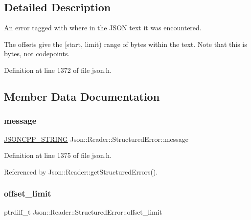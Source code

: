 \subsection{Detailed Description}
An error tagged with where in the J\+S\+ON text it was encountered. 

The offsets give the \mbox{[}start, limit) range of bytes within the text. Note that this is bytes, not codepoints. 

Definition at line 1372 of file json.\+h.



\subsection{Member Data Documentation}
\mbox{\label{struct_json_1_1_reader_1_1_structured_error_a2d2dc387aefe406a71de3daa263a38f4}} 
\subsubsection{\texorpdfstring{message}{message}}
{\footnotesize\ttfamily \hyperlink{json_8h_a1e723f95759de062585bc4a8fd3fa4be}{J\+S\+O\+N\+C\+P\+P\+\_\+\+S\+T\+R\+I\+NG} Json\+::\+Reader\+::\+Structured\+Error\+::message}



Definition at line 1375 of file json.\+h.



Referenced by Json\+::\+Reader\+::get\+Structured\+Errors().

\mbox{\label{struct_json_1_1_reader_1_1_structured_error_ad76ac01aeb0ada7e882c2df5daa54c6e}} 
\subsubsection{\texorpdfstring{offset\+\_\+limit}{offset\_limit}}
{\footnotesize\ttfamily ptrdiff\+\_\+t Json\+::\+Reader\+::\+Structured\+Error\+::offset\+\_\+limit}



